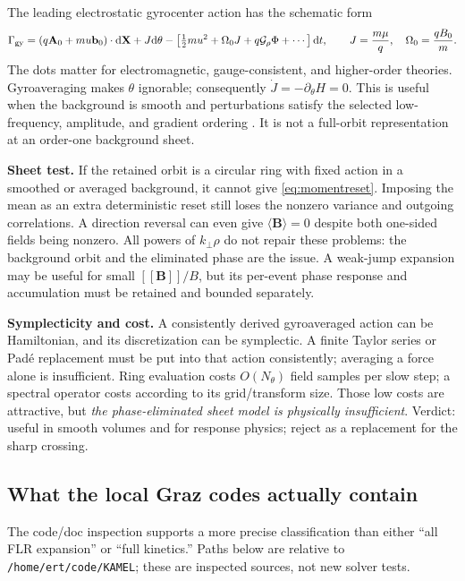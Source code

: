 \documentclass[10pt,a4paper]{article}
\newcommand{\B}{\mathbf B}\newcommand{\bunit}{\mathbf b}
\newcommand{\X}{\mathbf X}\newcommand{\n}{\mathbf n}
\newcommand{\A}{\mathbf A}\newcommand{\dd}{\mathrm d}
\newcommand{\jump}[1]{[\![#1]\!]}
\newcommand{\avg}[1]{\langle #1\rangle}
\newcommand{\pathref}[1]{\texttt{\nolinkurl{#1}}}
\begin{document}
The leading electrostatic gyrocenter action has the schematic form
\begin{equation}\label{eq:gk}
 \Gamma_{\rm gy}=(q\A_0+m u\bunit_0)\cdot\dd\X+J\dd\theta
    -\left[\tfrac12mu^2+\Omega_0 J+q\mathcal G_\rho\Phi+\cdots\right]\dd t,
 \qquad J=\frac{m\mu}{q},\quad\Omega_0=\frac{qB_0}{m}.
\end{equation}
The dots matter for electromagnetic, gauge-consistent, and higher-order theories. Gyroaveraging makes $\theta$ ignorable; consequently $\dot J=-\partial_\theta H=0$. This is useful when the background is smooth and perturbations satisfy the selected low-frequency, amplitude, and gradient ordering \cite{brizardhahm,carybrizard}. It is not a full-orbit representation at an order-one background sheet.

\textbf{Sheet test.} If the retained orbit is a circular ring with fixed action in a smoothed or averaged background, it cannot give \eqref{eq:momentreset}. Imposing the mean as an extra deterministic reset still loses the nonzero variance and outgoing correlations. A direction reversal can even give $\avg{\B}=0$ despite both one-sided fields being nonzero. All powers of $k_\perp\rho$ do not repair these problems: the background orbit and the eliminated phase are the issue. A weak-jump expansion may be useful for small $\jump{\B}/B$, but its per-event phase response and accumulation must be retained and bounded separately.

\textbf{Symplecticity and cost.} A consistently derived gyroaveraged action can be Hamiltonian, and its discretization can be symplectic. A finite Taylor series or Pad\'e replacement must be put into that action consistently; averaging a force alone is insufficient. Ring evaluation costs $O(N_\theta)$ field samples per slow step; a spectral operator costs according to its grid/transform size. Those low costs are attractive, but \emph{the phase-eliminated sheet model is physically insufficient}. Verdict: useful in smooth volumes and for response physics; reject as a replacement for the sharp crossing.

\subsection{What the local Graz codes actually contain}
\label{sec:kim}
The code/doc inspection supports a more precise classification than either ``all FLR expansion'' or ``full kinetics.'' Paths below are relative to \pathref{/home/ert/code/KAMEL}; these are inspected sources, not new solver tests.
\end{document}
